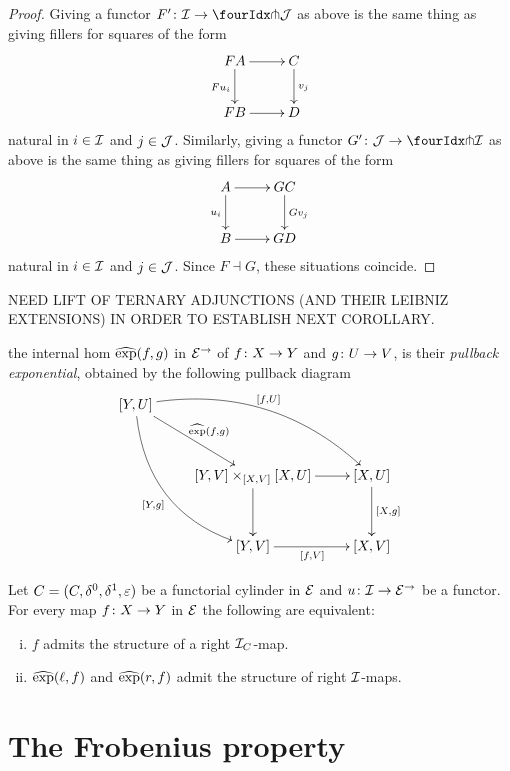 \documentclass[reqno,10pt,a4paper,oneside]{amsart}
\begin{document}
\begin{proof} Giving a functor $F' \co \cal{I} \to \liftl{\cal{J}}$ as above is the same thing as giving fillers for squares of the form
\[
\xymatrix{
FA \ar[d]_{F u_i} \ar[r] & C \ar[d]^{v_j} \\
FB \ar[r] & D }
\]
natural in $i  \in \cal{I}$ and $j \in \cal{J}$. Similarly, giving a functor $G' \co \cal{J} \to \liftl{\cal{I}}$ as above is the same thing as giving fillers for squares 
of the form
\[
\xymatrix{
A \ar[d]_{u_i} \ar[r] & GC \ar[d]^{Gv_j} \\
B \ar[r] & GD }
\]
 natural in $i \in \cal{I}$ and $j \in \cal{J}$. Since $F \dashv G$, these situations coincide.
\end{proof}



NEED LIFT OF TERNARY ADJUNCTIONS (AND THEIR LEIBNIZ EXTENSIONS) IN ORDER TO ESTABLISH NEXT COROLLARY.

the internal hom $\hatexp(f,g)$ in $\catE^\to$ of $f \co X \to Y$ and $g \co U \to V$, is their \emph{pullback exponential}, obtained by the following pullback diagram
\[
\xymatrix@R=1.2cm{
[Y, U] \ar@/^2pc/[drr]^{[f,U]} \ar@/_2pc/[ddr]_{[Y,g]}  \ar[dr]^{\hatexp(f,g)} & & \\ 
 & [Y,V] \times_{[X,V]} [X,U]  \ar[d] \ar[r] & [X,U] \ar[d]^{[X,g]} \\
 & [Y,V] \ar[r]_{[f,V]} & [X,V] }
 \]



\begin{corollary}[TO BE REWRITTEN] \label{prod-exp-general}
Let $\cyl = (\cyl, \lcyl, \rcyl, \ccyl)$ be a functorial cylinder in $\catE$ and
 $u \co \cal{I} \to \catE^\to$ be a functor. For every map $f \co X \to Y$ in $\cal{E}$ 
 the following are equivalent: 
\begin{enumerate}[(i)]
\item $f$ admits the structure of a right $\cal{I}_\cyl$-map. 
\item $\hatexp(\intervall, f)$ and $\hatexp(\intervalr, f)$ admit the structure of right $\cal{I}$-maps.
\end{enumerate} 
\end{corollary}






\section{The Frobenius property}
\label{sec:frobenius}
\end{document}
